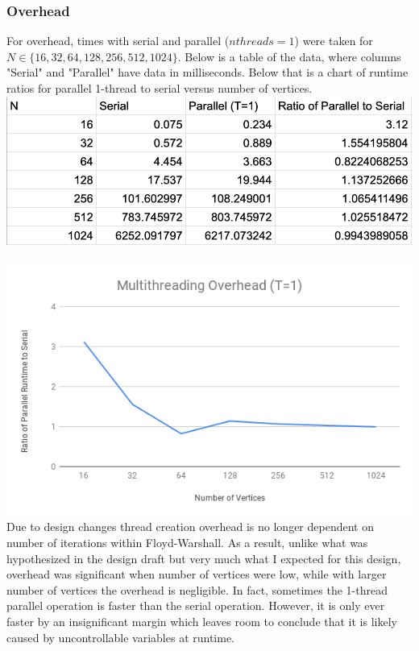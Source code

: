 \documentclass{article}
\begin{document}
\begin{adjustwidth}{-2cm}{-2cm}
\subsubsection{Overhead}
For overhead, times with serial and parallel ($nthreads = 1$) were taken for $N \in \{16,32,64,128,256,512,1024\}$. Below is a table of the data, where columns "Serial" and "Parallel" have data in milliseconds. Below that is a chart of runtime ratios for parallel 1-thread to serial versus number of vertices.\\
\includegraphics[width=\linewidth]{overheaddata.png}\\
\null\\
\includegraphics[width=\linewidth]{overhead.png}\\
Due to design changes thread creation overhead is no longer dependent on number of iterations within Floyd-Warshall. As a result, unlike what was hypothesized in the design draft but very much what I expected for this design, overhead was significant when number of vertices were low, while with larger number of vertices the overhead is negligible. In fact, sometimes the 1-thread parallel operation is faster than the serial operation. However, it is only ever faster by an insignificant margin which leaves room to conclude that it is likely caused by uncontrollable variables at runtime.

\end{adjustwidth}
\end{document}
